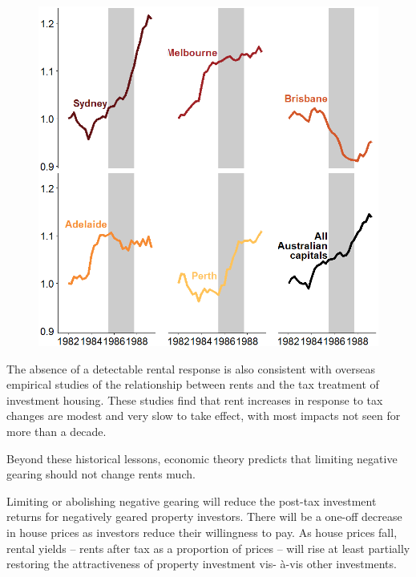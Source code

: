 \documentclass{grattan}\usepackage[]{graphicx}\usepackage[]{color}
\begin{document}
\begin{figure}
\includegraphics[width=\columnwidth]{CGT-NG-atlas/Capital_city_rents_direct_abs-1}
\end{figure}

The absence of a detectable rental response is also consistent with overseas empirical studies of the relationship between rents and the tax treatment of investment housing. These studies find that rent increases in response to tax changes are modest  and very slow to take effect, with most impacts not seen for more than a decade. 

Beyond these historical lessons, economic theory predicts that limiting negative gearing should not change rents much. 

Limiting or abolishing negative gearing will reduce the post-tax investment returns for negatively geared property investors. There will be a one-off decrease in house prices as investors reduce their willingness to pay. As house prices fall, rental yields -- rents after tax as a proportion of prices -- will rise at least partially restoring the attractiveness of property investment vis- à-vis other investments. 
\end{document}
